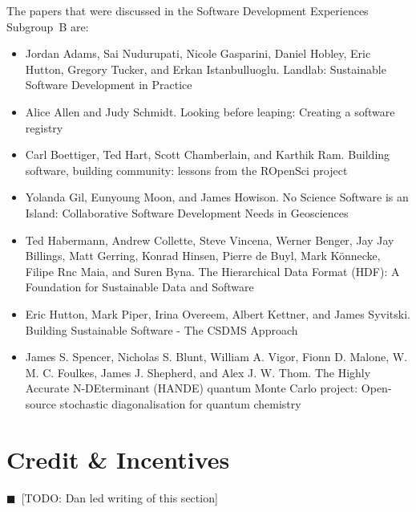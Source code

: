\documentclass[11pt, oneside]{amsart}
\newcommand{\todo}[1]{{\color{blue}$\blacksquare$~\textsf{[TODO: #1]}}}
\begin{document}
The papers that were discussed in the Software Development Experiences Subgroup~B are:

\begin{itemize}

\item Jordan Adams, Sai Nudurupati, Nicole Gasparini, Daniel Hobley, Eric
Hutton, Gregory Tucker, and Erkan Istanbulluoglu. Landlab: Sustainable Software
Development in Practice ~\cite{wssspe2_adams}

\item Alice Allen and Judy Schmidt. Looking before leaping: Creating a software
registry~\cite{wssspe2_allen}

\item Carl Boettiger, Ted Hart, Scott Chamberlain, and Karthik Ram. Building
software, building community: lessons from the {ROpenSci}
project~\cite{wssspe2_boettiger}

\item Yolanda Gil, Eunyoung Moon, and James Howison. No Science Software is an
Island: Collaborative Software Development Needs in
Geosciences~\cite{wssspe2_gil}

\item Ted Habermann, Andrew Collette, Steve Vincena, Werner Benger, Jay Jay
Billings, Matt Gerring, Konrad Hinsen, Pierre de Buyl, Mark K\"{o}nnecke, Filipe
Rnc Maia, and Suren Byna. The Hierarchical Data Format ({HDF}): A Foundation for
Sustainable Data and Software~\cite{wssspe2_habermann}

\item Eric Hutton, Mark Piper, Irina Overeem, Albert Kettner, and James Syvitski.
Building Sustainable Software - The {CSDMS} Approach~\cite{wssspe2_hutton}

\item James S. Spencer, Nicholas S. Blunt, William A. Vigor, Fionn D. Malone, W.
M. C. Foulkes, James J. Shepherd, and Alex J. W. Thom. The {H}ighly {A}ccurate
{N-DE}terminant ({HANDE}) quantum {Monte Carlo} project: Open-source stochastic
diagonalisation for quantum chemistry~\cite{wssspe2_spencer}
\end{itemize}

\section{Credit \& Incentives} \label{sec:credit}
\todo{Dan led writing of this section}
\end{document}
